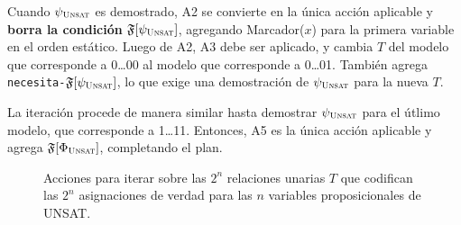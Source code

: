 Cuando $\psi_{\textsc{Unsat}}$ es demostrado, A2 se convierte en la única acción
aplicable y \textbf{borra la condición} $\FT[\psi_\UNSAT]$, agregando
Marcador($x$) para la primera variable en el orden estático.
Luego de A2, A3 debe ser aplicado, y cambia $T$ del modelo que corresponde a
0\ldots00 al modelo que corresponde a 0\ldots01. También agrega
\texttt{necesita-}$\FT[\psi_\UNSAT]$, lo que exige una demostración de
$\psi_{\textsc{Unsat}}$ para la nueva $T$.

La iteración procede de manera similar hasta demostrar $\psi_{\textsc{Unsat}}$ para el
útlimo modelo, que corresponde a 1\ldots11. Entonces, A5 es la única acción
aplicable y agrega $\FT[\Phi_\UNSAT]$, completando el plan.

\begin{figure}[t]
\centering
\fbox{
  \resizebox{!}{1.5in}{
    \begin{minipage}{3.6in}
    \begin{tabbing}
    Pre: \= \kill
    [A1] \textsc{ComenzarPrueba}: \\[.2em]
    Pre: \> \texttt{necesita-}$\FT[\Phi_\UNSAT]$ \\
    Efe: \> para cada $x\in\text{Var}$: no-T($x$) \,, \\
         \> $\neg$\texttt{necesita-}$\FT[\Phi_\UNSAT]$ \,,\, \texttt{necesita-}$\FT[\psi_\UNSAT]$ \\[1em]
    [A2] \textsc{PrimeraIteración}($x$): \\[.2em]
    Pre: \> $\FT[\psi_\UNSAT]$ \,,\, VarPrimera-T($x$) \\
    Efe: \> $\neg$$\FT[\psi_\UNSAT]$ \,,\, Marcador-T($x$) \\[1em]
*** ¿POR QUÉ ESTOS NOMBRES? ***
    [A3] \textsc{SiguienteSobreExcluidos}($x$): \\[.2em]
    Pre: \> Marcador-T($x$) \,,\, no-T($x$) \\
    Efe: \> $\neg$no-T($x$) \,,\, T($x$) \,,\, $\neg$Marcador-T($x$) \,,\, \texttt{necesita-}$\FT[\psi_\UNSAT]$ \\[1em]
    [A4] \textsc{SiguienteSobreIncluidos}($x,y$): \\[.2em]
    Pre: \> Marcador-T($x$) \,,\, T($x$) \,,\, VarSuc-T($x,y$) \\
    Efe: \> $\neg$T($x$) \,,\, no-T($x$) \,,\, $\neg$Marcador-T($x$) \,,\, Marcador-T($y$) \\[1em]
    [A5] \textsc{TerminarPrueba}($x$): \\[.2em]
    Pre: Marcador-T($x$) \,,\, T($x$) \,,\, VarÚlt-T($x$) \\
    Efe: $\neg$T($x$) \,,\, no-T($x$) \,,\, $\neg$Marcador-T($x$) \,,\, $\FT[\Phi_\UNSAT]$
    \end{tabbing}
    \end{minipage}
*** ¿POR QUÉ HACE FALTA T Y NO-T? ***
  }
}
\caption[Acciones para realizar la iteración del cuantificador universal de
segundo orden]{Acciones para iterar sobre las $2^n$ relaciones unarias $T$
  que codifican las $2^n$ asignaciones de verdad para las $n$ variables
proposicionales de UNSAT.}
\label{fig:unsat}
\end{figure}

